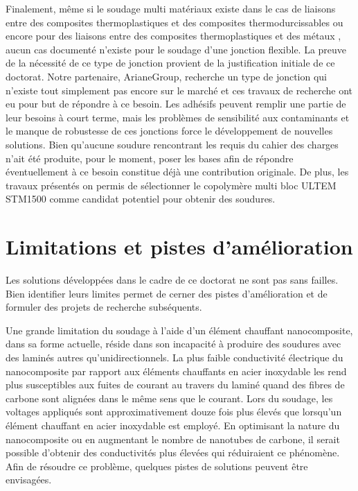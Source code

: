Finalement, même si le soudage multi matériaux existe dans le cas de liaisons entre des composites thermoplastiques et des composites thermodurcissables \cite{FernandezVillegas2015,Lionetto2018a} ou encore pour des liaisons entre des composites thermoplastiques et des métaux \cite{Weidmann2018,Kruger2004,Balle2009,Goushegir2016}, aucun cas documenté n'existe pour le soudage d'une jonction flexible. 
La preuve de la nécessité de ce type de jonction provient de la justification initiale de ce doctorat.
Notre partenaire, ArianeGroup, recherche un type de jonction qui n'existe tout simplement pas encore sur le marché et ces travaux de recherche ont eu pour but de répondre à ce besoin. 
Les adhésifs peuvent remplir une partie de leur besoins à court terme, mais les problèmes de sensibilité aux contaminants et le manque de robustesse de ces jonctions force le développement de nouvelles solutions. 
Bien qu'aucune soudure rencontrant les requis du cahier des charges n'ait été produite, pour le moment, poser les bases afin de répondre éventuellement à ce besoin constitue déjà une contribution originale. 
De plus, les travaux présentés on permis de sélectionner le copolymère multi bloc ULTEM STM1500 comme candidat potentiel pour obtenir des soudures. 

\section{Limitations et pistes d'amélioration}

Les solutions développées dans le cadre de ce doctorat ne sont pas sans failles. 
Bien identifier leurs limites permet de cerner des pistes d'amélioration et de formuler des projets de recherche subséquents. 

Une grande limitation du soudage à l'aide d'un élément chauffant nanocomposite, dans sa forme actuelle, réside dans son incapacité à produire des soudures avec des laminés autres qu'unidirectionnels. 
La plus faible conductivité électrique du nanocomposite par rapport aux éléments chauffants en acier inoxydable les rend plus susceptibles aux fuites de courant au travers du laminé quand des fibres de carbone sont alignées dans le même sens que le courant. 
Lors du soudage, les voltages appliqués sont approximativement douze fois plus élevés que lorsqu'un élément chauffant en acier inoxydable est employé. 
En optimisant la nature du nanocomposite ou en augmentant le nombre de nanotubes de carbone, il serait possible d'obtenir des conductivités plus élevées qui réduiraient ce phénomène. 
Afin de résoudre ce problème, quelques pistes de solutions peuvent être envisagées. 

